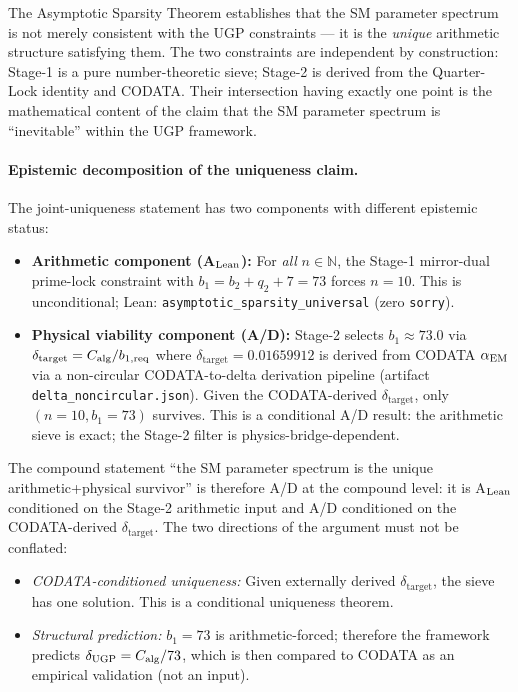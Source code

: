 \documentclass[11pt]{article}
\theoremstyle{remark}
\newcommand{\deltatar}{\delta_{\mathrm{target}}}
\newcommand{\Calg}{C_{\mathrm{alg}}}
\begin{document}
The Asymptotic Sparsity Theorem establishes that the SM parameter spectrum is not
merely consistent with the UGP constraints --- it is the \emph{unique} arithmetic
structure satisfying them.
The two constraints are independent by construction: Stage-1 is a pure number-theoretic
sieve; Stage-2 is derived from the Quarter-Lock identity and CODATA.
Their intersection having exactly one point is the mathematical content of the claim
that the SM parameter spectrum is ``inevitable'' within the UGP framework.

\paragraph{Epistemic decomposition of the uniqueness claim.}
The joint-uniqueness statement has two components with different epistemic status:

\begin{itemize}[leftmargin=1.5em,itemsep=0.15em]
  \item \textbf{Arithmetic component (A$_{\rm Lean}$):} For \emph{all} $n \in \mathbb{N}$, the Stage-1 mirror-dual prime-lock constraint with $b_1 = b_2 + q_2 + 7 = 73$ forces $n = 10$.  This is unconditional; Lean: \texttt{asymptotic\_sparsity\_universal} (zero \texttt{sorry}).

  \item \textbf{Physical viability component (A/D):} Stage-2 selects $b_1 \approx 73.0$ via $\deltatar = \Calg/b_{1,\rm req}$ where $\deltatar = 0.01659912$ is derived from CODATA $\alpha_{\rm EM}$ via a non-circular CODATA-to-delta derivation pipeline (artifact \texttt{delta\_noncircular.json}).  Given the CODATA-derived $\deltatar$, only $(n{=}10, b_1{=}73)$ survives.  This is a conditional A/D result: the arithmetic sieve is exact; the Stage-2 filter is physics-bridge-dependent.
\end{itemize}

The compound statement ``the SM parameter spectrum is the unique arithmetic+physical survivor'' is therefore A/D at the compound level: it is A$_{\rm Lean}$ conditioned on the Stage-2 arithmetic input and A/D conditioned on the CODATA-derived $\deltatar$.  The two directions of the argument must not be conflated:

\begin{itemize}[leftmargin=1.5em,itemsep=0.1em]
  \item \emph{CODATA-conditioned uniqueness:} Given externally derived $\deltatar$, the sieve has one solution. This is a conditional uniqueness theorem.
  \item \emph{Structural prediction:} $b_1=73$ is arithmetic-forced; therefore the framework predicts $\delta_{\rm UGP} = \Calg/73$, which is then compared to CODATA as an empirical validation (not an input).
\end{itemize}
\end{document}
